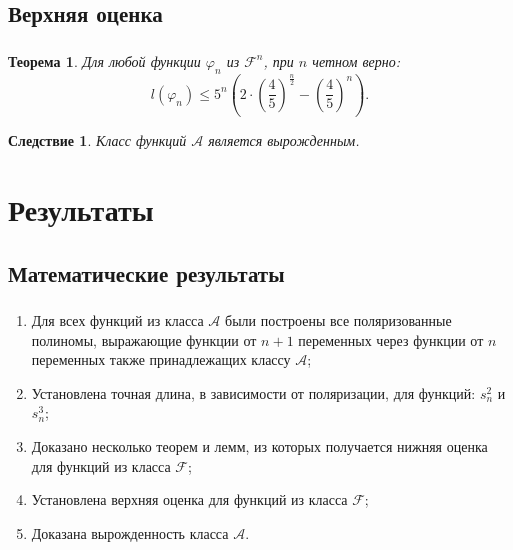 \documentclass[t]{beamer}
\newtheorem{myth}{Теорема}
\newtheorem*{myco}{Следствие}
\begin{document}
\subsection{Верхняя оценка}
\begin{frame}
\frametitle{\insertsection}
\framesubtitle{\insertsubsection}
 {
\begin{myth}
\label{thh}
Для любой функции $\varphi_n$ из $\mathcal{F}^n$, при $n$ четном верно:
$$ l(\varphi_n) \leqslant 5^n\left(2\cdot\left(\frac{4}{5}\right)^{\frac{n}{2}} -
\left( \frac{4}{5} \right)^n\right).$$
\end{myth}
}
 {
\begin{myco}
Класс функций $\mathcal{A}$ является вырожденным.
\end{myco}
}
\end{frame}

\section{Результаты}
\subsection{Математические результаты}
\begin{frame}
\frametitle{\insertsection}
\framesubtitle{\insertsubsection}
\begin{enumerate}
\item Для всех функций из класса $\mathcal{A}$ были построены все поляризованные
полиномы, выражающие функции от $n+1$ переменных через функции от $n$ переменных также принадлежащих
классу $\mathcal{A}$;
\item<2-> Установлена точная длина, в зависимости от поляризации, для функций: $s^2_n$ и $s^3_n$;
\item<3-> Доказано несколько теорем и лемм, из которых получается нижняя оценка для функций из
класса $\mathcal{F}$;
\item<4-> Установлена верхняя оценка для функций из класса $\mathcal{F}$;
\item<5-> Доказана вырожденность класса $\mathcal{A}$.
\end{enumerate}
\end{frame}
\end{document}
